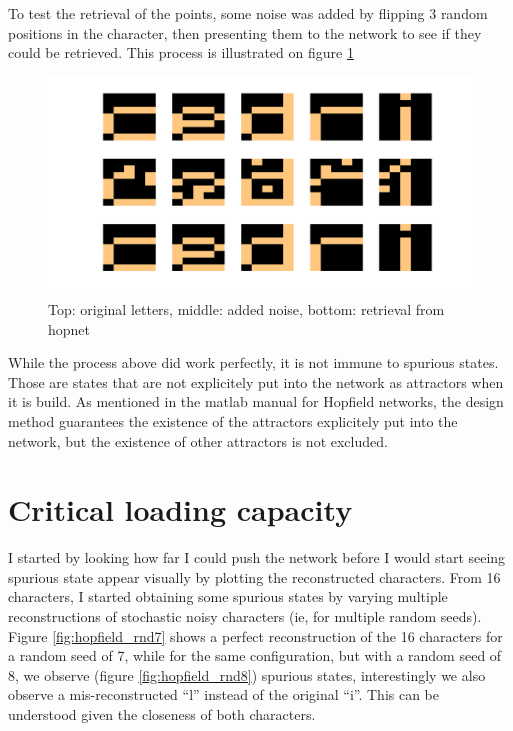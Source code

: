 \documentclass[11pt, a4paper]{article}
\begin{document}
To test the retrieval of the points, some noise was added by flipping
3 random positions in the character, then presenting them to the
network to see if they could be retrieved. This process is illustrated
on figure \ref{fig:hopfield_chargen}

\begin{figure}[H]
  \centering
  \includegraphics[scale=.30]{hopfield_denoising.png}
  \caption{Top: original letters, middle: added noise, bottom:
    retrieval from hopnet}
  \label{fig:hopfield_chargen}
\end{figure}

While the process above did work perfectly, it is not immune to
spurious states. Those are states that are not explicitely put into
the network as attractors when it is build. As mentioned in the matlab
manual for Hopfield networks, the design method guarantees the
existence of the attractors explicitely put into the network, but the
existence of other attractors is not excluded.

\section{Critical loading capacity}

I started by looking how far I could push the network before I would
start seeing spurious state appear visually by plotting the
reconstructed characters. From 16 characters, I started obtaining some
spurious states by varying multiple reconstructions of stochastic
noisy characters (ie, for multiple random seeds). Figure
\ref{fig:hopfield_rnd7} shows a perfect reconstruction of the 16
characters for a random seed of 7, while for the same configuration,
but with a random seed of 8, we observe (figure
\ref{fig:hopfield_rnd8}) spurious states, interestingly we also
observe a mis-reconstructed ``l'' instead of the original ``i''. This
can be understood given the closeness of both characters.
\end{document}
